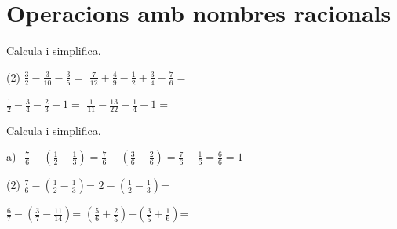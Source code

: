 \section{Operacions amb nombres racionals}

\begin{theorybox} 
\begin{multicols}{2}
	\centering
{}
\end{multicols}
\end{theorybox}

\vspace{2cm}

\begin{mylist}
	
\exer[1] \spen Calcula i simplifica.
 
\begin{tasks}(2)
\task $\frac{3}{2} -\frac{3}{10} -\frac{3}{5} =$                \task  $\frac{7}{12} +\frac{4}{9} -\frac{1}{2} +\frac{3}{4} -\frac{7}{6} =$  

\vsoo

\task $\frac{1}{2} -\frac{3}{4} -\frac{2}{3} +1=$                \task $\frac{1}{11} -\frac{13}{22} -\frac{1}{4} +1=$


\end{tasks}
\vsooo
{}

 
\exer[1] \spen  Calcula i simplifica.
 
 \begin{example}
 	 a) $\ \ \frac{7}{6} - \left(\frac{1}{2}-\frac{1}{3}\right)=\frac{7}{6}-\left(\frac{3}{6}-\frac{2}{6}\right)=\frac{7}{6}-\frac{1}{6}=\frac{6}{6}=1$
 	 \vspace{0.25cm}
 \end{example}

\begin{tasks}(2)
\task$\frac{7}{6} -\left(\frac{1}{2} -\frac{1}{3} \right)$=                   \task $2-\left(\frac{1}{2} -\frac{1}{3} \right)$=               
\vsoo

\task $\frac{6}{7} -\left(\frac{3}{7} -\frac{11}{14} \right)$=                    \task $\left(\frac{5}{6} +\frac{2}{5} \right)$$-\left(\frac{3}{5} +\frac{1}{6} \right)$=             
\vsoo


\end{tasks}
\end{mylist}
